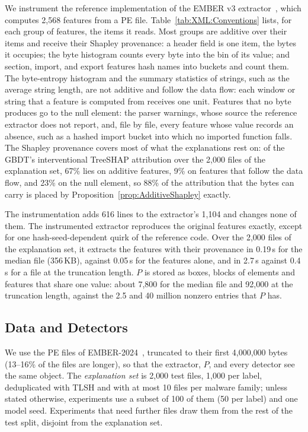 We instrument the reference implementation of the EMBER v3 extractor~\cite{joyce2025ember}, which computes 2{,}568
features from a PE file. Table~\ref{tab:XML:Conventions} lists, for each group of features, the items it reads. Most
groups are additive over their items and receive their Shapley provenance: a header field is one item, the bytes it
occupies; the byte histogram counts every byte into the bin of its value; and section, import, and export features hash
names into buckets and count them. The byte-entropy histogram and the summary statistics of strings, such as the
average string length, are not additive and follow the data flow: each window or string that a feature is computed
from receives one unit.
Features that no byte produces go to the null element: the parser warnings, whose source the reference extractor does
not report, and, file by file, every feature whose value records an absence, such as a hashed import bucket into which
no imported function falls. The Shapley provenance covers most of what the explanations rest on: of the GBDT's
interventional TreeSHAP attribution over the 2{,}000 files of the explanation set, 67\% lies on additive features, 9\% on
features that follow the data flow, and 23\% on the null element, so 88\% of the attribution that the bytes can carry
is placed by Proposition~\ref{prop:AdditiveShapley} exactly.

The instrumentation adds 616 lines to the extractor's 1{,}104 and changes none of them. The instrumented extractor
reproduces the original features exactly, except for one hash-seed-dependent quirk of the reference code. Over the
2{,}000 files of the explanation set, it extracts the features with their provenance in 0.19\,s for the median file
(356\,KB), against 0.05\,s for the features alone, and in 2.7\,s against 0.4\,s for a file at the truncation length.
$P$ is stored as boxes, blocks of elements and features that share one value: about 7{,}800 for the median file and
92{,}000 at the truncation length, against the 2.5 and 40 million nonzero entries that $P$ has.

\subsection{Data and Detectors}
\label{sec:XML:SetupData}

We use the PE files of EMBER-2024~\cite{joyce2025ember}, truncated to their first 4{,}000{,}000 bytes (13--16\% of the
files are longer), so that the extractor, $P$, and every detector see the same object. The \emph{explanation set} is
2{,}000 test files, 1{,}000 per label, deduplicated with TLSH and with at most 10 files per malware family; unless stated
otherwise, experiments use a subset of 100 of them (50 per label) and one model seed. Experiments that need further
files draw them from the rest of the test split, disjoint from the explanation set.

